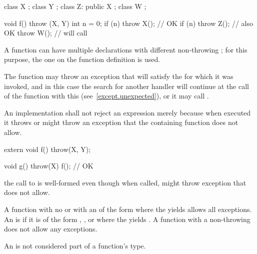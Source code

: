 \enterexample
\begin{codeblock}
class X { };
class Y { };
class Z: public X { };
class W { };

void f() throw (X, Y) {
  int n = 0;
  if (n) throw X();             // OK
  if (n) throw Z();             // also OK
  throw W();                    // will call 
}
\end{codeblock}
\exitexample

\enternote A function can have multiple declarations with different non-throwing
; for this purpose, the one on the
function definition is used. \exitnote

\pnum
{}%
The function
may throw an exception that will satisfy the
for which it was invoked, and in this case the search for another handler
will continue at the call of the function with this
(see~\ref{except.unexpected}), or it may call
.

\pnum
An implementation shall not reject an expression merely because when
executed it throws or might
throw an exception that the containing function does not allow.
\enterexample
\begin{codeblock}
extern void f() throw(X, Y);

void g() throw(X) {
  f();                          // OK
}

\end{codeblock}
the call to
is well-formed even though when called,
might throw exception
that
does not allow.
\exitexample

\pnum
A function with no
or with an  of the form
\tcode{)} where
the  yields 
allows all exceptions.
An  is  if it is of the
form , , or
\tcode{)} where the
 yields .
A function with a non-throwing
does not allow any exceptions.

\pnum
An
is not considered part of a function's type.

